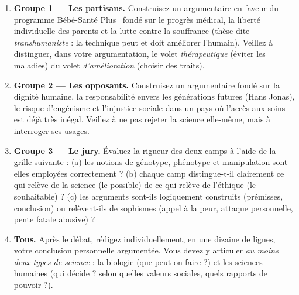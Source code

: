 \documentclass[11pt]{article}
\newcounter{popsec}
\newcounter{popsub}
\newcommand{\courssub}[1]{%
  \stepcounter{popsub}%
  \par\vspace{9pt}\noindent{\popxbold\fontsize{11.5}{13}\selectfont\color{popink}{\color{poporange}\thepopsec.\thepopsub}\hspace{6pt}#1}\par\nopagebreak\vspace{4pt}
}
\begin{document}
\begin{enumerate}
\item \textbf{Groupe 1 — Les partisans.} Construisez un argumentaire en faveur du programme \guillemotleft Bébé-Santé Plus \guillemotright\ fondé sur le progrès médical, la liberté individuelle des parents et la lutte contre la souffrance (thèse dite \emph{transhumaniste} : la technique peut et doit améliorer l'humain). Veillez à distinguer, dans votre argumentation, le volet \emph{thérapeutique} (éviter les maladies) du volet \emph{d'amélioration} (choisir des traits).
\item \textbf{Groupe 2 — Les opposants.} Construisez un argumentaire fondé sur la dignité humaine, la responsabilité envers les générations futures (Hans Jonas), le risque d'eugénisme et l'injustice sociale dans un pays où l'accès aux soins est déjà très inégal. Veillez à ne pas rejeter la science elle-même, mais à interroger ses usages.
\item \textbf{Groupe 3 — Le jury.} Évaluez la rigueur des deux camps à l'aide de la grille suivante : (a) les notions de génotype, phénotype et manipulation sont-elles employées correctement ? (b) chaque camp distingue-t-il clairement ce qui relève de la science (le possible) de ce qui relève de l'éthique (le souhaitable) ? (c) les arguments sont-ils logiquement construits (prémisses, conclusion) ou relèvent-ils de sophismes (appel à la peur, attaque personnelle, pente fatale abusive) ?
\item \textbf{Tous.} Après le débat, rédigez individuellement, en une dizaine de lignes, votre conclusion personnelle argumentée. Vous devez y articuler \emph{au moins deux types de science} : la biologie (que peut-on faire ?) et les sciences humaines (qui décide ? selon quelles valeurs sociales, quels rapports de pouvoir ?).
\end{enumerate}

\courssub{Ressources à mobiliser}
\end{document}
